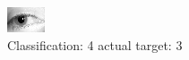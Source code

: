 \begin{figure}[h!]
\begin{center}
\includegraphics[width=0.60\columnwidth]{figures/ID1290_class_4_target_3.png}
\end{center}
\caption{ Classification: 4 actual target: 3}
\label{fig:ID1290_class_4_target_3}
\end{figure}
